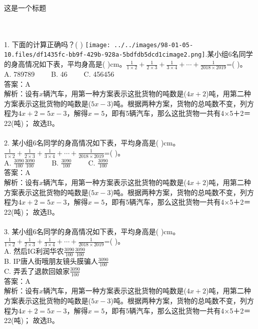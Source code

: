 \documentclass [UTF8]{ctexart}
\begin{document}
\begin{center}\end{center}\begin{center}\Large{这是一个标题}\end{center}
\\\\1. 下面的计算正确吗？(  ) \quad\texttt{[image: ../../images/98-01-05-10.files/df1435fc-bb9f-429b-928a-5bdfdb5dcd1cimage2.png]}.某小组6名同学的身高情况如下表，平均身高是( )cm。\( \displaystyle \frac{1}{1\times 2}+\frac{1}{2\times 3}+\frac{1}{3\times 4}+\cdots +\frac{1}{2018\times 2019}\)=( )。\\
A. 789789　　 B. 46　　 C. 456456　　 \\
答案：A\\
解析：设有\( x\)辆汽车，用第一种方案表示这批货物的吨数是(\( 4x+2\))吨，用第二种方案表示这批货物的吨数是(\( 5x-3\))吨。根据两种方案，货物的总吨数不变，列方程为\( 4x+2=5x-3\)，解得\( x=5\)，即有5辆汽车，那么这批货物一共有4×5＋2＝22(吨)； 故选B。\\
\\
2. 某小组6名同学的身高情况如下表，平均身高是( )cm。\( \displaystyle \frac{1}{1\times 2}+\frac{1}{2\times 3}+\frac{1}{3\times 4}+\cdots +\frac{1}{2018\times 2019}\)=( )。\\
A. \( \frac{3090}{100}\)\( \frac{3090}{100}\)　　 B. \( \frac{3090}{100}\)　　 C. \( \frac{3090}{100}\)　　 \\
答案：A\\
解析：设有\( x\)辆汽车，用第一种方案表示这批货物的吨数是(\( 4x+2\))吨，用第二种方案表示这批货物的吨数是(\( 5x-3\))吨。根据两种方案，货物的总吨数不变，列方程为\( 4x+2=5x-3\)，解得\( x=5\)，即有5辆汽车，那么这批货物一共有4×5＋2＝22(吨)； 故选B。\\
\\
3. 某小组6名同学的身高情况如下表，平均身高是( )cm。\( \displaystyle \frac{1}{1\times 2}+\frac{1}{2\times 3}+\frac{1}{3\times 4}+\cdots +\frac{1}{2018\times 2019}\)=( )。\\
A. 然后IG利润华农\( \frac{3090}{100}\)\( \frac{3090}{100}\)　　 \\
B. IP唐人街哦朋友镜头膜骗人\( \frac{3090}{100}\)　　 \\
C. 弄丢了退款回娘家\( \frac{3090}{100}\)　　 \\
答案：A\\
解析：设有\( x\)辆汽车，用第一种方案表示这批货物的吨数是(\( 4x+2\))吨，用第二种方案表示这批货物的吨数是(\( 5x-3\))吨。根据两种方案，货物的总吨数不变，列方程为\( 4x+2=5x-3\)，解得\( x=5\)，即有5辆汽车，那么这批货物一共有4×5＋2＝22(吨)； 故选B。\\
\\
 
\end{document}
